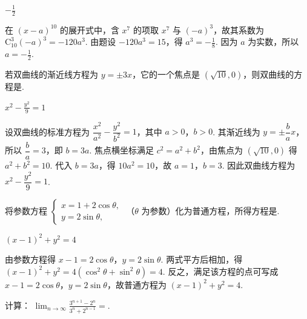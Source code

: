 \begin{answer}
\(-\frac{1}{2}\)
\end{answer}

\begin{solution}
在 \((x-a)^{10}\) 的展开式中，含 \(x^7\) 的项取 \(x^{7}\) 与 \((-a)^3\)，故其系数为 \(\mathrm C_{10}^{3}(-a)^3=-120a^3\). 由题设 \(-120a^3=15\)，得 \(a^3=-\frac18\). 因为 \(a\) 为实数，所以 \(a=-\frac12\).
\end{solution}

\begin{problem}
若双曲线的渐近线方程为 \( y = \pm 3x \)，它的一个焦点是 \( (\sqrt{10}, 0) \)，则双曲线的方程是\fillinblank{}.
\end{problem}

\begin{answer}
\(x^2-\frac{y^2}{9}=1\)
\end{answer}

\begin{solution}
设双曲线的标准方程为 \(\dfrac{x^2}{a^2}-\dfrac{y^2}{b^2}=1\)，其中 \(a>0\)，\(b>0\). 其渐近线为 \(y=\pm\dfrac ba x\)，所以 \(\dfrac ba=3\)，即 \(b=3a\). 焦点横坐标满足 \(c^2=a^2+b^2\)，由焦点为 \((\sqrt{10},0)\) 得 \(a^2+b^2=10\). 代入 \(b=3a\)，得 \(10a^2=10\)，故 \(a=1\)，\(b=3\). 因此双曲线方程为 \(x^2-\dfrac{y^2}{9}=1\).
\end{solution}

\begin{problem}
将参数方程 \( \begin{cases}
x=1+2\cos\theta,\\
y=2\sin\theta,
\end{cases} \) （\( \theta \) 为参数）化为普通方程，所得方程是\fillinblank{}.
\end{problem}

\begin{answer}
\((x-1)^2+y^2=4\)
\end{answer}

\begin{solution}
由参数方程得 \(x-1=2\cos\theta\)，\(y=2\sin\theta\). 两式平方后相加，得 \((x-1)^2+y^2=4(\cos^2\theta+\sin^2\theta)=4\). 反之，满足该方程的点可写成 \(x-1=2\cos\theta\)，\(y=2\sin\theta\)，故普通方程为 \((x-1)^2+y^2=4\).
\end{solution}

\begin{problem}
计算： \( \displaystyle\lim_{n\to\infty}\frac{3^{n+1}-2^{n}}{3^{n}+2^{n-1}}= \)\fillinblank{}.
\end{problem}

